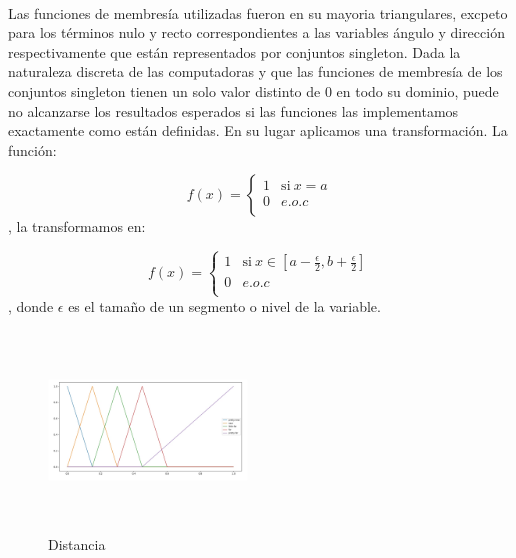 \documentclass[a4paper,10pt]{article}
\begin{document}
	\paragraph{} Las funciones de membresía utilizadas fueron en su mayoria triangulares, excpeto para los términos nulo y recto correspondientes
	a las variables ángulo y dirección respectivamente que están representados por conjuntos singleton. Dada la naturaleza discreta de las computadoras y que las funciones 		de membresía de los  conjuntos singleton tienen un solo valor distinto de 0 en todo su dominio, puede no alcanzarse los resultados esperados si las funciones las 				implementamos exactamente como están definidas. En su lugar aplicamos una transformación. La función:

	\begin{equation}
		\label{eq:singleton}
		f(x) = \left\{
		\begin{array}{lc}
			1 & \mathrm{si\ } x = a \\
			0 & e.o.c \\
		\end{array}
		\right.
	\end{equation},   
	la transformamos en:
	   
	\begin{equation}
		\label{eq:trapezoidal}
		f(x) = \left\{
			\begin{array}{lc}
			 	1 & \mathrm{si\ } x \in  [a - \frac{\epsilon}{2}, b + \frac{\epsilon}{2}] \\
			 	0 & e.o.c \\
		      \end{array}
		     \right.
	\end{equation},   
	donde $\epsilon$ es el tamaño de un segmento o nivel de la variable.
	   
	\begin{figure}[htb]%
		\begin{center}
			\includegraphics[width=200px, height=200px]{images/distance_plot.jpg}
		\end{center}
		\caption{Distancia \label{fig:distance_plot}}%
	\end{figure}
	
\end{document}
